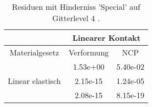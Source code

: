 \begin{table} 
\centering 
\begin{tabular}{c|cc|} 
\cline{2-3} 
 & \multicolumn{2}{|c|}{Linearer Kontakt} \\ 
\hline 
\multicolumn{1}{|c|}{Materialgesetz} & \multicolumn{1}{c|}{Verformung} & \multicolumn{1}{c|}{NCP} \\ 
\hline 
\multicolumn{1}{|c|}{\multirow{3}{*}{Linear elastisch}} &\multicolumn{1}{|c|}{  1.53e+00} & \multicolumn{1}{|c|}{  5.40e-02} \\ 
\multicolumn{1}{|c|}{} & \multicolumn{1}{|c|}{  2.15e-15} & \multicolumn{1}{|c|}{  1.24e-05} \\ 
\multicolumn{1}{|c|}{} & \multicolumn{1}{|c|}{  2.08e-15} & \multicolumn{1}{|c|}{  8.15e-19} \\ 
\hline 
\end{tabular}\caption{Residuen mit Hinderniss 'Special' auf Gitterlevel 4 .}\label{tab:Residuum_Special_level4}
\end{table} 
